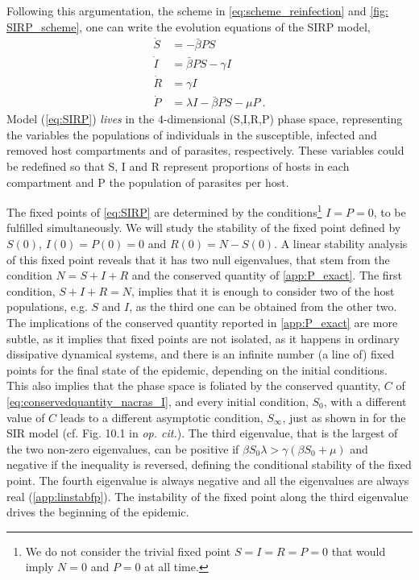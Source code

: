 Following this argumentation, the scheme in \cref{eq:scheme_reinfection}
and \cref{fig: SIRP_scheme}, one can write the evolution equations of the SIRP
model,
\begin{equation}\label{eq:SIRP}
    \begin{aligned}
        \dot{S} & =-\bar{\beta} P S                    \\
        \dot{I} & =\bar{\beta} P S-\gamma I            \\
        \dot{R} & =\gamma I                            \\
        \dot{P} & =\lambda I-\bar{\beta} P S-\mu P \ .
    \end{aligned}
\end{equation}
Model (\cref{eq:SIRP})	\textit{lives} in the $4$-dimensional (S,I,R,P)
phase space, representing the variables
the populations of individuals in the susceptible, infected and removed
host compartments and of parasites, respectively. These variables could be
redefined so that S, I and R represent proportions of hosts in each compartment
and P the population of parasites per host.

The fixed points of \cref{eq:SIRP} are determined by the
conditions\footnote{We do not consider the trivial fixed point $S=I=R=P=0$ that
    would imply $N=0$ and $P=0$ at all time.}
$I=P=0$, to be fulfilled simultaneously.
We will study the stability of the fixed point defined by $S(0)$,
$I(0)=P(0)=0$ and $R(0)=N-S(0)$.
A linear stability analysis of this fixed point reveals that it has two
null eigenvalues, that stem from the condition $N=S+I+R$ and the conserved
quantity of \cref{app:P_exact}.
The first condition, $S+I+R=N$, implies that it is enough to consider two
of the host populations, e.g. $S$ and $I$, as the third one can be obtained
from the other two. The implications of the conserved quantity reported in
\cref{app:P_exact} are more subtle, as it implies that fixed points are not
isolated, as it happens in ordinary dissipative dynamical systems, and there is
an infinite number (a line of) fixed points for the final state of the
epidemic, depending on the initial conditions. This also implies that the phase
space is foliated by the conserved quantity, $C$ of
\cref{eq:conservedquantity_nacras_I}, and every initial condition, $S_0$, with a
different value of $C$ leads to a different asymptotic condition, $S_{\infty}$,
just as shown in \cite{Murray_book} for the SIR model (cf. Fig. 10.1 in
\textit{op. cit.}).
The third eigenvalue, that is the largest of the two non-zero eigenvalues,
can be positive if $\beta S_0 \lambda>\gamma(\beta S_0+\mu)$ and negative if
the inequality is reversed, defining the conditional stability of the fixed
point. The fourth eigenvalue is always negative and all the eigenvalues are
always real (\cref{app:linstabfp}).
The instability of the fixed point along the third eigenvalue drives the
beginning of the epidemic.

